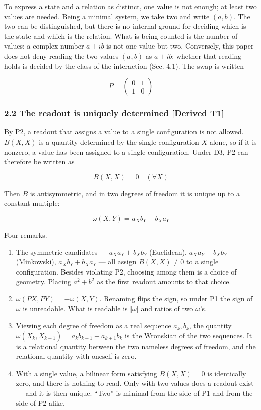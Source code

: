 \documentclass[
  a4paper,
]{article}
\begin{document}
To express a state and a relation as distinct, one value is not enough;
at least two values are needed. Being a minimal system, we take two and
write \((a,b)\). The two can be distinguished, but there is no internal
ground for deciding which is the state and which is the relation. What
is being counted is the number of values: a complex number \(a+ib\) is
not one value but two. Conversely, this paper does not deny reading the
two values \((a,b)\) as \(a+ib\); whether that reading holds is decided
by the class of the interaction (Sec. 4.1). The swap is written

\[
P=\begin{pmatrix}0&1\\1&0\end{pmatrix}
\]

\subsubsection{2.2 The readout is uniquely determined {[}Derived
T1{]}}\label{the-readout-is-uniquely-determined-derived-t1}

By P2, a readout that assigns a value to a single configuration is not
allowed. \(B(X,X)\) is a quantity determined by the single configuration
\(X\) alone, so if it is nonzero, a value has been assigned to a single
configuration. Under D3, P2 can therefore be written as

\[
B(X,X)=0\quad(\forall X)
\]

Then \(B\) is antisymmetric, and in two degrees of freedom it is unique
up to a constant multiple:

\[
\boxed{\;\omega(X,Y)=a_Xb_Y-b_Xa_Y\;}
\]

Four remarks.

\begin{enumerate}
\def\labelenumi{(\roman{enumi})}
\item
  The symmetric candidates --- \(a_Xa_Y+b_Xb_Y\) (Euclidean),
  \(a_Xa_Y-b_Xb_Y\) (Minkowski), \(a_Xb_Y+b_Xa_Y\) --- all assign
  \(B(X,X)\neq0\) to a single configuration. Besides violating P2,
  choosing among them is a choice of geometry. Placing \(a^2+b^2\) as
  the first readout amounts to that choice.
\item
  \(\omega(PX,PY)=-\omega(X,Y)\). Renaming flips the sign, so under P1
  the sign of \(\omega\) is unreadable. What is readable is \(|\omega|\)
  and ratios of two \(\omega\)'s.
\item
  Viewing each degree of freedom as a real sequence \(a_k,b_k\), the
  quantity \(\omega(X_k,X_{k+1})=a_kb_{k+1}-a_{k+1}b_k\) is the
  Wronskian of the two sequences. It is a relational quantity between
  the two nameless degrees of freedom, and the relational quantity with
  oneself is zero.
\item
  With a single value, a bilinear form satisfying \(B(X,X)=0\) is
  identically zero, and there is nothing to read. Only with two values
  does a readout exist --- and it is then unique. ``Two'' is minimal
  from the side of P1 and from the side of P2 alike.
\end{enumerate}
\end{document}
